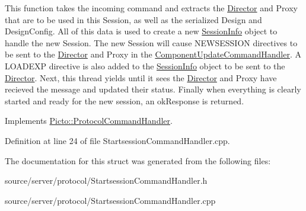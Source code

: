 This function takes the incoming command and extracts the \hyperlink{class_director}{Director} and Proxy that are to be used in this Session, as well as the serialized Design and Design\-Config. All of this data is used to create a new \hyperlink{class_session_info}{Session\-Info} object to handle the new Session. The new Session will cause N\-E\-W\-S\-E\-S\-S\-I\-O\-N directives to be sent to the \hyperlink{class_director}{Director} and Proxy in the \hyperlink{struct_component_update_command_handler}{Component\-Update\-Command\-Handler}. A L\-O\-A\-D\-E\-X\-P directive is also added to the \hyperlink{class_session_info}{Session\-Info} object to be sent to the \hyperlink{class_director}{Director}. Next, this thread yields until it sees the \hyperlink{class_director}{Director} and Proxy have recieved the message and updated their status. Finally when everything is clearly started and ready for the new session, an ok\-Response is returned. 

Implements \hyperlink{struct_picto_1_1_protocol_command_handler_aeeaa16fe40f10fd55996d74e16e29cad}{Picto\-::\-Protocol\-Command\-Handler}.



Definition at line 24 of file Startsession\-Command\-Handler.\-cpp.



The documentation for this struct was generated from the following files\-:\begin{DoxyCompactItemize}
\item 
source/server/protocol/Startsession\-Command\-Handler.\-h\item 
source/server/protocol/Startsession\-Command\-Handler.\-cpp\end{DoxyCompactItemize}
